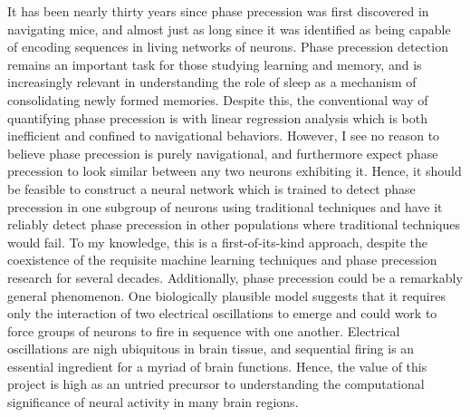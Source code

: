 \documentclass[12pt, letterpaper]{article}
\begin{document}
It has been nearly thirty years since phase precession was first discovered in navigating mice, and almost just as long since it was identified as being capable of encoding sequences in living networks of neurons. Phase precession detection remains an important task for those studying learning and memory, and is increasingly relevant in understanding the role of sleep as a mechanism of consolidating newly formed memories. Despite this, the conventional way of quantifying phase precession is with linear regression analysis which is both inefficient and confined to navigational behaviors. However, I see no reason to believe phase precession is purely navigational, and furthermore expect phase precession to look similar between any two neurons exhibiting it. Hence, it should be feasible to construct a neural network which is trained to detect phase precession in one subgroup of neurons using traditional techniques and have it reliably detect phase precession in other populations where traditional techniques would fail. To my knowledge, this is a first-of-its-kind approach, despite the coexistence of the requisite machine learning techniques and phase precession research for several decades. Additionally, phase precession could be a remarkably general phenomenon. One biologically plausible model suggests that it requires only the interaction of two electrical oscillations to emerge and could work to force groups of neurons to fire in sequence with one another. Electrical oscillations are nigh ubiquitous in brain tissue, and sequential firing is an essential ingredient for a myriad of brain functions. Hence, the value of this project is high as an untried precursor to understanding the computational significance of neural activity in many brain regions.\\

\\
\\
\end{document}
